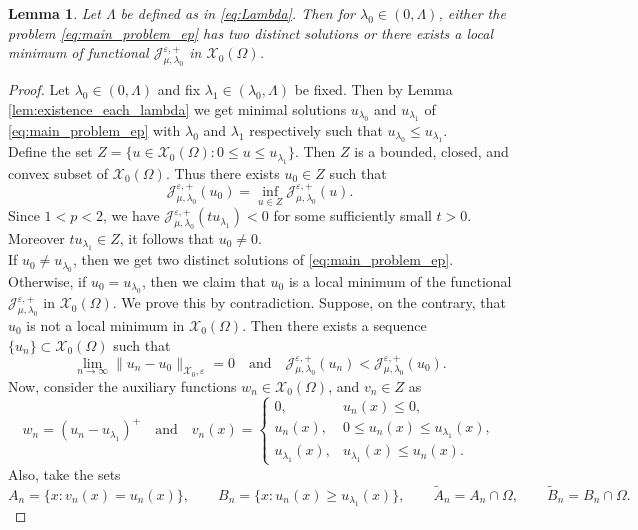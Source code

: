 \documentclass[11pt]{article}
\newtheorem{lemma}{Lemma}[section] %
\newcommand{\om} {\Omega}
\newcommand{\la} {\lambda}
\newcommand{\La} {\Lambda}
\newcommand{\X}{\mathcal{X}_0} %
\newcommand{\Xe}{\mathcal{X}_{0},\varepsilon} %
\newcommand{\Jepo}{\mathcal{J}_{\mu, \lambda_0}^{\varepsilon,+}}
\begin{document}
 
\begin{lemma}
Let $\La$ be defined as in \eqref{eq:Lambda}. Then for $\la_0 \in (0,\La)$, either the problem \eqref{eq:main_problem_ep} has two distinct solutions or there exists a local minimum of functional $\Jepo$ in $\X(\om)$.
\end{lemma}
\begin{proof}
Let \(\lambda_0 \in (0,\Lambda)\) and fix \(\lambda_1 \in (\lambda_0, \Lambda)\) be fixed. Then by Lemma \ref{lem:existence_each_lambda} we get minimal solutions $u_{\lambda_0}$ and $u_{\la_1}$ of \eqref{eq:main_problem_ep} with $\lambda_0 $ and $\la_1$ respectively such that $u_{\lambda_0} \leq u_{\lambda_1}$. \\
Define the set $Z = \{ u \in \X(\Omega) : 0 \leq u \leq u_{\lambda_1} \}$. Then \(Z\) is a bounded, closed, and convex subset of \(\X(\Omega)\). Thus there exists $u_0 
\in Z$ such that
\begin{equation*}
\Jepo(u_0) = \inf_{u \in Z} \Jepo (u).
\end{equation*}
Since \(1 < p < 2\), we have $\Jepo(t u_{\lambda_1}) < 0$ for some sufficiently small $t > 0$. Moreover \(t u_{\lambda_1} \in Z\), it follows that \(u_0 \neq 0\).\\
If $u_0 \neq u_{\la_0}$, then we get two distinct solutions of \eqref{eq:main_problem_ep}. Otherwise, if $u_0 =  u_{\la_0}$, then we claim that \(u_0\) is a local minimum of the functional \(\Jepo\) in $\X(\om)$. We prove this by contradiction. Suppose, on the contrary, that \(u_0\) is not a local minimum in $\X(\om)$. Then there exists a sequence \(\{u_n\} \subset \X(\om)\) such that
\begin{equation*}
\lim_{n \to \infty} \|u_n - u_0\|_{\Xe} = 0
\quad \text{and} \quad
\Jepo(u_n) < \Jepo(u_0).
\end{equation*}
Now, consider the auxiliary functions $w_n \in \X(\om)$, and $v_n \in Z$ as
\begin{equation*}
w_n = (u_n - u_{\lambda_1})^+ \quad \text{and} \quad v_n(x) =
\begin{cases}
0, & u_n(x) \leq 0, \\[6pt]
u_n(x), & 0 \leq u_n(x) \leq u_{\lambda_1}(x), \\[6pt]
u_{\lambda_1}(x), & u_{\lambda_1}(x) \leq u_n(x).
\end{cases}
\end{equation*}
Also, take the sets
\begin{equation*}
A_n = \{ x : v_n(x) = u_n(x) \}, 
\qquad 
B_n = \{ x : u_n(x) \geq u_{\lambda_1}(x) \},
\qquad 
\widetilde{A}_n = A_n \cap \Omega, 
\qquad 
\widetilde{B}_n = B_n \cap \Omega.
\end{equation*}


\end{proof}
\end{document}
